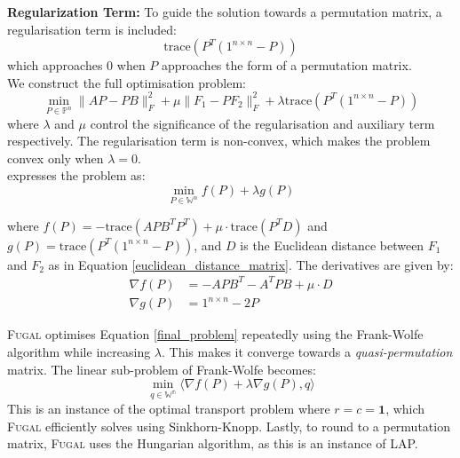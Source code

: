 \noindent
\textbf{Regularization Term:} To guide the solution towards a permutation matrix, a regularisation term is included:
\begin{equation}
   \text{trace}(P^T(1^{n \times n}-P))  
\end{equation}
which approaches 0 when $P$ approaches the form of a permutation matrix.\\

\noindent
We construct the full optimisation problem:
\begin{equation}\label{full_optimization_problem}
     \min_{P \in \mathds{P}^n} \lVert AP-PB \rVert^2_F + \mu \lVert F_1 - P F_2 \rVert^2_F + \lambda \text{trace}(P^T(1^{n \times n}-P))
\end{equation} 
where $\lambda$ and $\mu$ control the significance of the regularisation and auxiliary term respectively. The regularisation term is non-convex, which makes the problem convex only when $\lambda = 0$.\\

\noindent
\cite{fugal2024} expresses the problem as:
\begin{equation}\label{final_problem}
    \min_{P \in \mathds{W}^n} f(P) + \lambda g(P)
\end{equation}

\noindent
where $f(P) = -\text{trace}(APB^TP^T) + \mu \cdot \text{trace}(P^TD)$ and $g(P) = \text{trace}(P^T(1^{n \times n} - P))$, and $D$ is the Euclidean distance between $F_1$ and $F_2$ as in Equation \ref{euclidean_distance_matrix}. The derivatives are given by:
\begin{equation}\label{sinkhorn-gradient}
    \begin{split}
        \nabla f(P) &= -APB^T - A^TPB + \mu \cdot D\\
        \nabla g(P) &= 1^{n \times n} - 2P
    \end{split}
\end{equation}

\noindent
\textsc{Fugal} optimises Equation \ref{final_problem} repeatedly using the Frank-Wolfe algorithm while increasing $\lambda$. This makes it converge towards a \textit{quasi-permutation} matrix. The linear sub-problem of Frank-Wolfe becomes:
\begin{equation}
     \min_{q\in \mathds{W^n}} \langle \nabla f(P) + \lambda \nabla g(P), q \rangle 
\end{equation}
This is an instance of the optimal transport problem where $r = c = \boldsymbol{1}$, which \textsc{Fugal} efficiently solves using Sinkhorn-Knopp. Lastly, to round to a permutation matrix, \textsc{Fugal} uses the Hungarian algorithm, as this is an instance of LAP.

